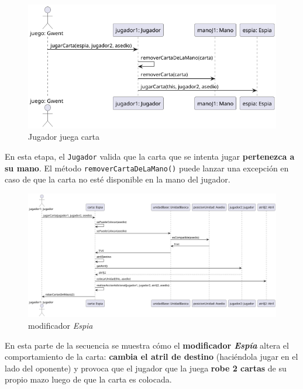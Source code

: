 \documentclass[titlepage,a4paper]{article}
\begin{document}
	\begin{figure}[H]
		\centering
		\includegraphics[width=1\textwidth]{diagramas/secuencia/JugarCarta2}
		\caption{\label{fig:secuencia02} Jugador juega carta}
	\end{figure}
	En esta etapa, el \texttt{Jugador} valida que la carta que se intenta jugar \textbf{pertenezca a su mano}. El método \texttt{removerCartaDeLaMano()} puede lanzar una excepción en caso de que la carta no esté disponible en la mano del jugador.

	\begin{figure}[H]
		\centering
		\includegraphics[width=1\textwidth]{diagramas/secuencia/jugarCarta3}
		\caption{\label{fig:secuencia03} modificador \textit{Espia}}
	\end{figure}
	En esta parte de la secuencia se muestra cómo el \textbf{modificador \textit{Espía}} altera el comportamiento de la carta: \textbf{cambia el atril de destino} (haciéndola jugar en el lado del oponente) y provoca que el jugador que la juega \textbf{robe 2 cartas} de su propio mazo luego de que la carta es colocada.
\end{document}
